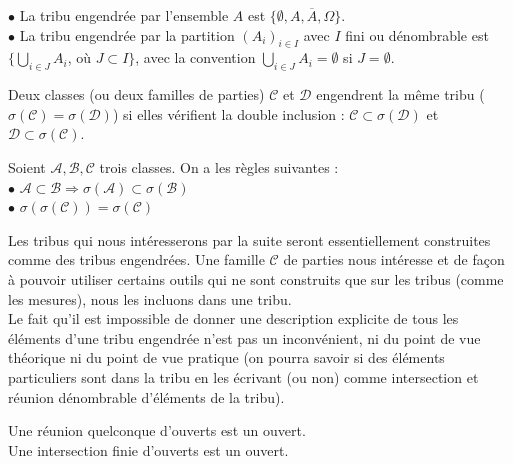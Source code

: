 \documentclass[landscape,twocolumn]{article}
\begin{document}
\begin{exe}
$\bullet$ La tribu engendrée par l'ensemble $A$ est $\{ \emptyset, A, \overline{A}, \Omega \}$. \\
$\bullet$ La tribu engendrée par la partition $(A_i)_{i \in I}$ avec $I$ fini ou dénombrable est $\{ \bigcup \limits_{i \in J} A_i$, où $J \subset I \}$, avec la convention $\bigcup \limits_{i \in J} A_i = \emptyset$ si $J = \emptyset$.
\end{exe}

\begin{theo}
Deux classes (ou deux familles de parties) $\mathcal{C}$ et $\mathcal{D}$ engendrent la même tribu ($\sigma(\mathcal{C}) =\sigma(\mathcal{D})$) si elles vérifient la double inclusion : $\mathcal{C} \subset \sigma(\mathcal{D})$ et $\mathcal{D} \subset \sigma(\mathcal{C})$.
\end{theo}

\begin{astu}
Soient $\mathcal{A}, \mathcal{B}, \mathcal{C}$ trois classes. On a les règles suivantes : \\
$\bullet$ $\mathcal{A} \subset \mathcal{B} \Longrightarrow  \sigma(\mathcal{A}) \subset \sigma(\mathcal{B})$ \\
$\bullet$  $\sigma(\sigma(\mathcal{C})) =  \sigma(\mathcal{C})$
\end{astu}

\begin{expli}
Les tribus qui nous intéresserons par la suite seront essentiellement construites comme des tribus engendrées. Une famille $\mathcal{C}$ de parties nous intéresse et de façon à pouvoir utiliser certains outils qui ne sont construits que sur les tribus (comme les mesures), nous les incluons dans une tribu. \\
Le fait qu'il est impossible de donner une description explicite de tous les éléments d'une tribu engendrée n'est pas un inconvénient, ni du point de vue théorique ni du point de vue pratique (on pourra savoir si des éléments particuliers sont dans la tribu en les écrivant (ou non) comme intersection et réunion dénombrable d'éléments de la tribu).
\end{expli}

\begin{rappel}
Une réunion quelconque d'ouverts est un ouvert. \\
Une intersection finie d'ouverts est un ouvert.
\end{rappel}
\end{document}

